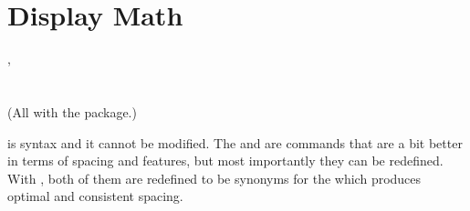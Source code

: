 
\NewCommandCopy{\oldsec}{\section}
\ExplSyntaxOff

\section{Display Math}\label{sec:display_math}
\instead{
\ai{\$\$}
} {
\csi{[}, \csi{]} \\
\\
\\
(All with the  package.)
}

\ai{\$\$} is  syntax and it cannot be modified. The
 and \csi{[} are  commands that are a bit better
in terms of spacing and features, but most importantly they can be redefined.
With , both of them are redefined to be synonyms for the
 which produces optimal and consistent spacing.

